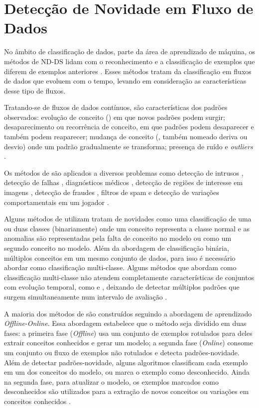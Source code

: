 \section{Detecção de Novidade em Fluxo de Dados}

No âmbito de classificação de dados, parte da área de aprendizado de máquina, os
métodos de \acf{ND-DS} lidam com o reconhecimento e a classificação de exemplos
que diferem de exemplos anteriores \cite{Markou2003,Perner2009,Gama2010}.
Esses métodos tratam da classificação em fluxos de dados que evoluem com o
tempo, levando em consideração as características desse tipo de fluxos.

Tratando-se de fluxos de dados contínuos, são características
dos padrões observados:
evolução de conceito (\evolution) em que novos padrões podem surgir;
desaparecimento ou recorrência de conceito, em que padrões podem desaparecer e
também podem reaparecer;
mudança de conceito (\drift, também nomeado deriva ou desvio) onde um padrão
gradualmente se transforma;
presença de ruído e \emph{outliers} \cite{Gama2010}.

Os métodos de \nd são aplicados a diversos problemas como
detecção de intrusos \cite{Coull2003,Spinosa2008,Viegas2019,Cassales2019a},
detecção de falhas \cite{Zhang2006},
diagnósticos médicos \cite{Perner2009},
detecção de regiões de interesse em imagens \cite{singh2004approach},
detecção de fraudes \cite{wang2003mining,Abdallah201690}, 
filtros de spam \cite{Hayat2010dct} e
detecção de variações comportamentais em um jogador \cite{Vallim20136258}.

Alguns métodos de \nd utilizam tratam de novidades como uma classificação de uma
ou duas classes (binariamente) onde um conceito representa a classe normal e as anomalias
são representadas pela falta de conceito no modelo ou como um segundo conceito
no modelo.
Além da abordagem de classificação binária, múltiplos conceitos em um mesmo
conjunto de dados, para isso é necessário abordar \nd como classificação
multi-classe.
Alguns métodos que abordam \nd como classificação multi-classe não
atendem completamente características de conjuntos com 
evolução temporal,
como \evolution e \drift, deixando de detectar múltiplos padrões que surgem
simultaneamente num intervalo de avaliação \cite{Faria2016ndds,Gama2010}.

A maioria dos métodos de \nd são construídos seguindo a abordagem de aprendizado
\emph{Offline-Online}. Essa abordagem estabelece que o método seja dividido em
duas fases:
a primeira fase (\emph{Offline}) usa um conjunto de exemplos rotulados para
deles extrair conceitos conhecidos e gerar um modelo;
a segunda fase (\emph{Online}) consome um conjunto ou fluxo de exemplos não
rotulados e detecta padrões-novidade.
Além de detectar padrões-novidade, alguns algoritmos classificam cada exemplo
em um dos conceitos do modelo, ou marca o exemplo como desconhecido.
Ainda na segunda fase, para atualizar o modelo, os exemplos marcados como
desconhecidos são utilizados para a extração de novos conceitos ou variações em
conceitos conhecidos \cite{Gama2010}.


